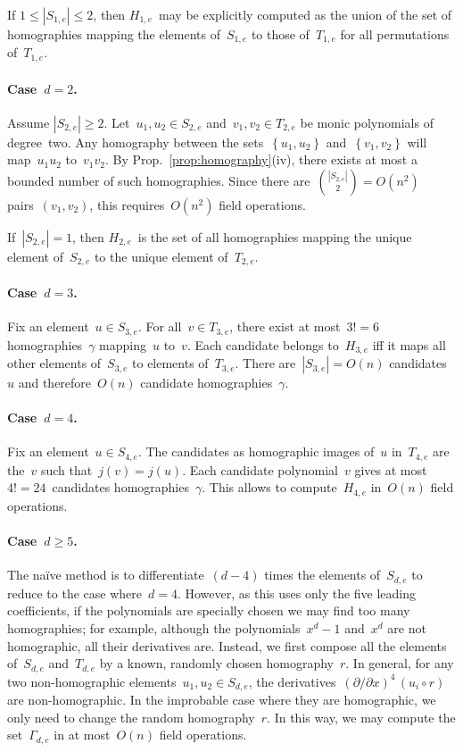 \documentclass{lms}%
\def\acco#1{\left\{#1\right\}}
\def\abs#1{\left|#1\right|}
\def\card#1{\abs{#1}}
\begin{document}
If $1 ≤ \card{S_{1,e}} ≤ 2$, then $H_{1,e}$~may be explicitly computed as
the union of the set of homographies mapping the elements of~$S_{1,e}$ to
those of~$T_{1,e}$ for all permutations of~$T_{1,e}$.

\paragraph{Case~$d = 2$.}
Assume $\card{S_{2,e}} ≥ 2$. Let~$u_1, u_2 ∈ S_{2,e}$ and~$v_1, v_2 ∈
T_{2,e}$ be monic polynomials of degree~two. Any homography between the
sets~$\acco{u_1, u_2}$ and~$\acco{v_1, v_2}$ will map~$u_1 u_2$ to~$v_1
v_2$. By Prop.~\ref{prop:homography}(iv), there exists at most a bounded
number of such homographies. Since there are~$\binom{\card{S_{2,e}}}{2} =
O(n^2)$ pairs~$(v_1, v_2)$, this requires~$O(n^2)$ field operations.

If~$\card{S_{2,e}} = 1$, then $H_{2,e}$~is the set of all homographies
mapping the unique element of~$S_{2,e}$ to the unique element
of~$T_{2,e}$.

\paragraph{Case~$d = 3$.}
Fix an element~$u ∈ S_{3,e}$. For all~$v ∈ T_{3,e}$, there exist at
most~$3! = 6$ homographies~$γ$ mapping~$u$ to~$v$. Each candidate belongs
to~$H_{3,e}$ iff it maps all other elements of~$S_{3,e}$ to elements
of~$T_{3,e}$. There are~$\card{S_{3,e}} = O(n)$ candidates~$u$ and
therefore~$O(n)$ candidate homographies~$γ$.

\paragraph{Case~$d = 4$.}
Fix an element~$u ∈ S_{4,e}$. The candidates as homographic images of~$u$
in~$T_{4,e}$ are the~$v$ such that~$j(v) = j(u)$. Each candidate
polynomial~$v$ gives at most $4! = 24$~candidates homographies~$γ$. This
allows to compute~$H_{4,e}$ in~$O(n)$ field operations.

\paragraph{Case~$d ≥ 5$.} The naïve method is to differentiate~$(d-4)$
times the elements of~$S_{d,e}$ to reduce to the case where~$d = 4$.
However, as this uses only the five leading coefficients, if the
polynomials are specially chosen we may find too many homographies; for
example, although the polynomials~$x^d-1$ and~$x^d$ are not homographic,
all their derivatives are. Instead, we first compose all the elements
of~$S_{d,e}$ and~$T_{d,e}$ by a known, randomly chosen homography~$r$. In
general, for any two non-homographic elements~$u_1, u_2 ∈ S_{d,e}$, the
derivatives~$(∂/∂x)^4\, (u_i ∘ r)$ are non-homographic. In the improbable
case where they are homographic, we only need to change the random
homography~$r$. In this way, we may compute the set~$Γ_{d,e}$ in at
most~$O(n)$ field operations.
\end{document}

